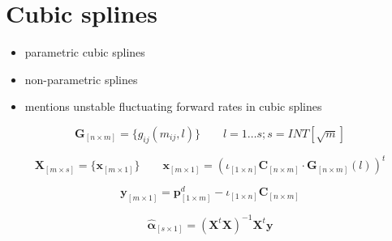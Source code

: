 \section{Cubic splines}
\label{sec:cubic-splines}

\begin{itemize}
\item parametric cubic splines \cite{McCulloch1971, McCulloch1975}
\item non-parametric splines \cite{Adams1994,Fisher1995, Waggoner1997, Tanggaard1997, Shea1985}
\item \cite{Shea1985} mentions unstable fluctuating forward rates in \cite{McCulloch1975} cubic splines

\end{itemize}


	$$\bm{G}_{\left[n \times m\right]} = \{  g_{ij}(m_{ij},l) \} \qquad   l = 1\dots s ; s= INT[\sqrt{m}]$$

	

	$$\bm{X}_{\left[m \times s\right]}=\{ \bm{x}_{\left[m \times 1\right]} \} \qquad  \bm{x}_{\left[m \times 1\right]} = \left( \iota_{\left[1\times n\right]} \bm{C}_{\left[n\times m\right]} \cdot \bm{G}_{\left[n\times m\right]}(l) \right)^t$$

	

	$$\bm{y}_{\left[m \times 1\right]}=  \bm{p}^d_{\left[1\times m\right]}  - \iota_{\left[1\times n\right]} \bm{C}_{\left[n\times m\right]}   $$

	

	$$\bm{\hat \alpha}_{\left[s \times 1\right]}= \left( \bm{X}^t   \bm{X}\right )^{-1}\bm{X}^t \bm{y}$$



